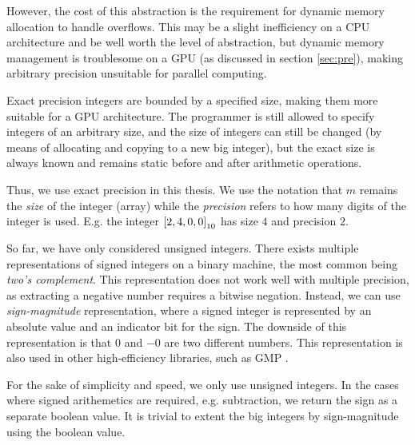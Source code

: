 However, the cost of this abstraction is the requirement for dynamic memory
allocation to handle overflows. This may be a slight inefficiency on a CPU
architecture and be well worth the level of abstraction, but dynamic memory
management is troublesome on a GPU (as discussed in section
\ref{sec:pre}), making arbitrary precision unsuitable for parallel computing.

Exact precision integers are bounded by a specified size, making them more
suitable for a GPU architecture. The programmer is still allowed to specify
integers of an arbitrary size, and the size of integers can still be changed (by
means of allocating and copying to a new big integer), but the exact size is
always known and remains static before and after arithmetic operations.

Thus, we use exact precision in this thesis. We use the notation that $m$
remains the \textit{size} of the integer (array) while the \textit{precision}
refers to how many digits of the integer is used. E.g. the integer
$\mathtt{[}2, 4, 0, 0\mathtt{]}_{10}$ has size $4$ and precision $2$.

So far, we have only considered unsigned integers. There exists multiple
representations of signed integers on a binary machine, the most common being
\textit{two's complement}. This representation does not work well with multiple
precision, as extracting a negative number requires a bitwise negation. Instead,
we can use \textit{sign-magnitude} representation, where a signed integer is
represented by an absolute value and an indicator bit for the sign. The downside
of this representation is that $0$ and $-0$ are two different numbers. This
representation is also used in other high-efficiency libraries, such as GMP
\cite{GMP}.

For the sake of simplicity and speed, we only use unsigned integers. In the
cases where signed arithemetics are required, e.g. subtraction, we return the
sign as a separate boolean value. It is trivial to extent the big integers by
sign-magnitude using the boolean value.


